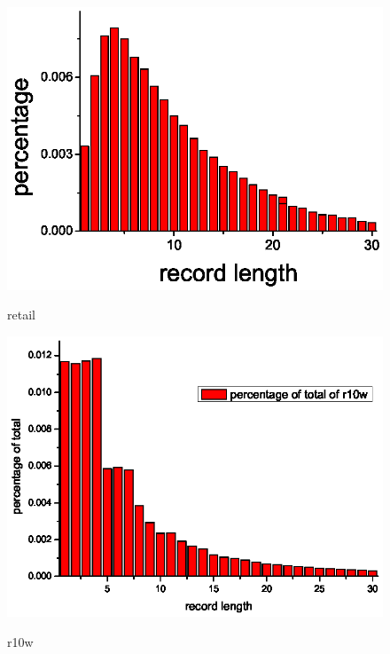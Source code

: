 \documentclass{article}
\begin{document}
\begin{figure}[htb]
   \centering
  \includegraphics[scale=.8]{retail.eps}\\
  \caption{retail}\label{fig:graph}
\end{figure}

\begin{figure}[htb]
   \centering
  \includegraphics[scale=.8]{r10w.eps}\\
  \caption{r10w}\label{fig:graph}
\end{figure}
\end{document}
